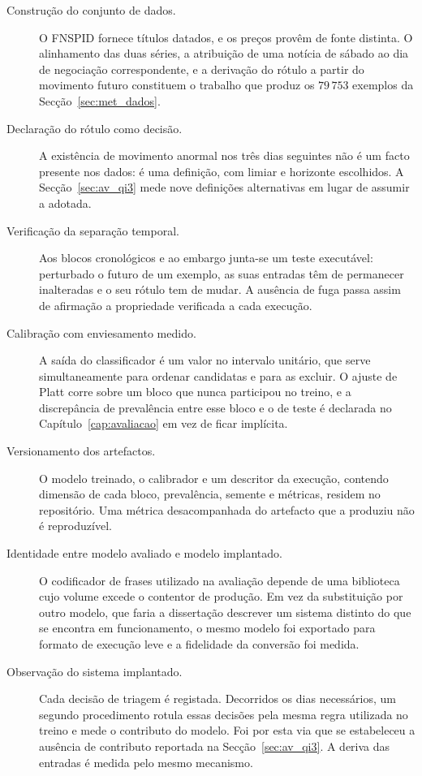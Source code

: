 \begin{description}
  \item[Construção do conjunto de dados.] O \gls{FNSPID} fornece títulos datados, e os preços
        provêm de fonte distinta. O alinhamento das duas séries, a atribuição de uma notícia de
        sábado ao dia de negociação correspondente, e a derivação do rótulo a partir do movimento
        futuro constituem o trabalho que produz os $79\,753$ exemplos da
        Secção~\ref{sec:met_dados}.

  \item[Declaração do rótulo como decisão.] A existência de movimento anormal nos três dias
        seguintes não é um facto presente nos dados: é uma definição, com limiar e horizonte
        escolhidos. A Secção~\ref{sec:av_qi3} mede nove definições alternativas em lugar de
        assumir a adotada.

  \item[Verificação da separação temporal.] Aos blocos cronológicos e ao embargo junta-se um
        teste executável: perturbado o futuro de um exemplo, as suas entradas têm de permanecer
        inalteradas e o seu rótulo tem de mudar. A ausência de fuga passa assim de afirmação a
        propriedade verificada a cada execução.

  \item[Calibração com enviesamento medido.] A saída do classificador é um valor no intervalo
        unitário, que serve simultaneamente para ordenar candidatas e para as excluir. O ajuste de
        Platt corre sobre um bloco que nunca participou no treino, e a discrepância de prevalência
        entre esse bloco e o de teste é declarada no Capítulo~\ref{cap:avaliacao} em vez de ficar
        implícita.

  \item[Versionamento dos artefactos.] O modelo treinado, o calibrador e um descritor da execução,
        contendo dimensão de cada bloco, prevalência, semente e métricas, residem no repositório.
        Uma métrica desacompanhada do artefacto que a produziu não é reproduzível.

  \item[Identidade entre modelo avaliado e modelo implantado.] O codificador de frases utilizado
        na avaliação depende de uma biblioteca cujo volume excede o contentor de produção. Em vez
        da substituição por outro modelo, que faria a dissertação descrever um sistema distinto do
        que se encontra em funcionamento, o mesmo modelo foi exportado para formato de execução
        leve e a fidelidade da conversão foi medida.

  \item[Observação do sistema implantado.] Cada decisão de triagem é registada. Decorridos os dias
        necessários, um segundo procedimento rotula essas decisões pela mesma regra utilizada no
        treino e mede o contributo do modelo. Foi por esta via que se estabeleceu a ausência de
        contributo reportada na Secção~\ref{sec:av_qi3}. A deriva das entradas é medida pelo mesmo
        mecanismo.
\end{description}

